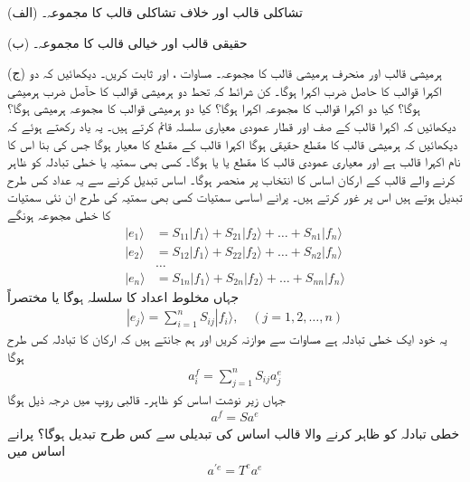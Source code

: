 (الف) تشاکلی قالب  اور خلاف تشاکلی قالب  کا مجموعہ۔

(ب) حقیقی قالب  اور خیالی قالب  کا مجموعہ۔

(ج) ہرمیشی قالب  اور منحرف ہرمیشی قالب  کا مجموعہ۔
مساوات ،  اور  ثابت کریں۔ دیکھائیں کہ دو اکہرا قوالب کا حاصل ضرب اکہرا ہوگا۔ کن شرائط کہ تحط دو ہرمیشی قوالب کا حآصل ضرب ہرمیشی ہوگا؟ کیا دو اکہرا قوالب کا مجموعہ اکہرا ہوگا؟ کیا دو ہرمیشی قوالب کا مجموعہ ہرمیشی ہوگا؟
دیکھائیں کہ اکہرا قالب کے صف اور قطار عمودی معیاری سلسلہ قائم کرتے ہیں۔
یہ یاد رکھتے ہوئے کہ  دیکھائیں کہ ہرمیشی قالب کا مقطع حقیقی ہوگا اکہرا قالب کے مقطع کا معیار  ہوگا جس کی بنا اس کا نام اکہرا قالب ہے اور معیاری عمودی قالب کا مقطع یا  یا  ہوگا۔
کسی بھی سمتیہ یا خطی تبادلہ کو ظاہر کرنے والے قالب کے ارکان اساس کا انتخاب پر منحصر ہوگا۔ اساس تبدیل کرنے سے یہ عداد کس طرح تبدیل ہوتے ہیں اس پر غور کرتے ہیں۔ پرانے اساسی سمتیات  کسی بھی سمتیہ کی طرح ان نئی سمتیات  کا خطی مجموعہ ہونگے
\begin{align*}
	|e_1\rangle &= S_{11}|f_1\rangle + S_{21}|f_2\rangle + \dots + S_{n1}|f_n\rangle\\
	|e_2\rangle &= S_{12}|f_1\rangle + S_{22}|f_2\rangle +
	\dots + S_{n2}|f_n\rangle\\
	&\dots\\
	|e_n\rangle &= S_{1n}|f_1\rangle + S_{2n}|f_2\rangle + \dots + S_{nn}|f_n\rangle
\end{align*}
جہاں  مخلوط اعداد کا سلسلہ ہوگا یا مختصراً
\begin{align}
	|e_{j}\rangle = \sum_{i=1}^{n}S_{ij}|f_i\rangle,\quad(j=1, 2, \dots, n)
\end{align}
یہ خود ایک خطی تبادلہ ہے مساوات  سے موازنہ کریں اور ہم جانتے ہیں کہ ارکان کا تبادلہ کس طرح ہوگا
\begin{align}
	a_i^f = \sum_{j=1}^{n}S_{ij}a_j^e
\end{align}
جہاں زیر نوشت اساس کو ظاہر۔ قالبی روپ میں درجہ ذیل ہوگا
\begin{align}
	a^f = Sa^e
\end{align}
خطی تبادلہ  کو ظاہر کرنے والا قالب اساس کی تبدیلی سے کس طرح تبدیل ہوگا؟ پرانے اساس میں 
\begin{align*}
	a^{'e} = T^ea^e
\end{align*}

